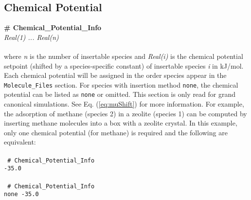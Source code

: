 \subsection{Chemical Potential}\label{sec:Chemical_Potential}
{\bf \# Chemical\_Potential\_Info} \\
{\it Real(1) ... Real(n)} \\ \\
%
where {\it n} is the number of insertable species and {\it Real(i)} is the 
chemical potential setpoint (shifted by a species-specific constant) of 
insertable species {\it i} in kJ/mol. Each chemical potential will be assigned 
in the order species appear in the \texttt{Molecule\_Files} section. 
For species with insertion method {\tt none}, 
the chemical potential can be listed as {\tt none} or omitted.
This section is only read for grand canonical simulations.
See Eq. (\ref{eq:muShift}) for more information. 
For example, the adsorption of methane (species 2) in a zeolite (species 1) 
can be computed by inserting methane molecules into a box with a zeolite crystal. 
In this example, only one chemical potential (for methane) is required 
and the following are equivalent: \\ \\
%
\texttt{
\# Chemical\_Potential\_Info \\
 -35.0} \\ \\
%
\texttt{
\# Chemical\_Potential\_Info \\
 none -35.0} \\ \\
%
%
%
%
%

